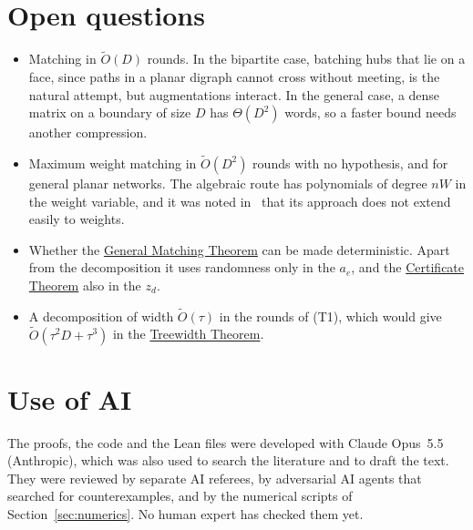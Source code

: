 \documentclass[11pt]{article}
\theoremstyle{definition}
\theoremstyle{remark}
\theoremstyle{plain}
\newcommand{\ThmGen}{\hyperref[thm:gen]{General Matching Theorem}}
\newcommand{\ThmCert}{\hyperref[thm:cert]{Certificate Theorem}}
\newcommand{\ThmTw}{\hyperref[thm:tw]{Treewidth Theorem}}
\newcommand{\Ot}{\tilde O}
\begin{document}
\section{Open questions}\label{sec:open}

\begin{itemize}
\item Matching in $\Ot(D)$ rounds. In the bipartite case, batching hubs that lie on a face, since paths in a planar digraph cannot cross without meeting, is the natural attempt, but augmentations interact. In the general case, a dense matrix on a boundary of size $D$ has $\Theta(D^2)$ words, so a faster bound needs another compression.
\item Maximum weight matching in $\Ot(D^2)$ rounds with no hypothesis, and for general planar networks. The algebraic route has polynomials of degree $nW$ in the weight variable, and it was noted in~\cite{FLPSW18} that its approach does not extend easily to weights.
\item Whether the \ThmGen{} can be made deterministic. Apart from the decomposition it uses randomness only in the $a_e$, and the \ThmCert{} also in the $z_d$.
\item A decomposition of width $\Ot(\tau)$ in the rounds of (T1), which would give $\Ot(\tau^2D+\tau^3)$ in the \ThmTw{}.
\end{itemize}

\section*{Use of AI}

The proofs, the code and the Lean files were developed with Claude Opus~5.5 (Anthropic), which was also used to search the literature and to draft the text. They were reviewed by separate AI referees, by adversarial AI agents that searched for counterexamples, and by the numerical
scripts of Section~\ref{sec:numerics}. No human expert has checked them yet.
\end{document}
